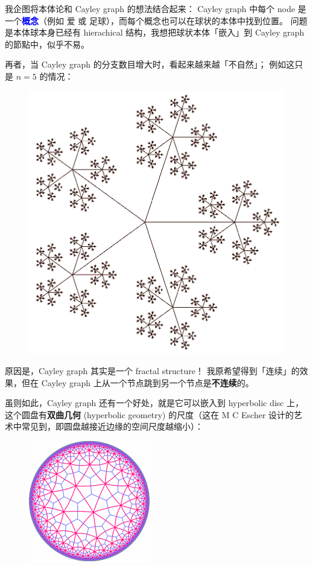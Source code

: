 \documentclass[12pt]{article}
\newcommand{\concept}[1]{\textbf{\textcolor{blue}{#1}}}
\newcommand{\formula}[1]{\textcolor{LogicColor}{#1}}
\begin{document}
我企图将本体论和 Cayley graph 的想法结合起来： Cayley graph 中每个 node 是一个\concept{概念}（例如 \formula{爱} 或 \formula{足球}），而每个概念也可以在球状的本体中找到位置。 问题是本体球本身已经有 hierachical 结构，我想把球状本体「嵌入」到 Cayley graph 的節點中，似乎不易。

再者，当 Cayley graph 的分支数目增大时，看起来越来越「不自然」； 例如这只是 $n=5$ 的情况：
\begin{figure}[H]
\centering
\includegraphics[scale=0.25]{cayley-graph-5.png}
\end{figure}
原因是，Cayley graph 其实是一个 fractal structure！ 我原希望得到「连续」的效果，但在 Cayley graph 上从一个节点跳到另一个节点是\textbf{不连续}的。

虽则如此，Cayley graph 还有一个好处，就是它可以嵌入到 hyperbolic disc 上，这个圆盘有\textbf{双曲几何} (hyperbolic geometry) 的尺度（这在 M C Escher 设计的艺术中常见到，即圆盘越接近边缘的空间尺度越缩小）：
\begin{figure}[H]
\centering
\includegraphics[scale=0.75]{hyperbolic-disc-beautiful.png}
\end{figure}
\end{document}
